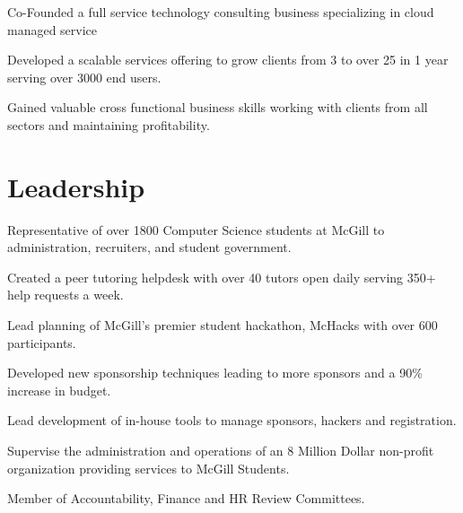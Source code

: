 \documentclass[]{deedy-resume-openfont}
\begin{document}
\begin{minipage}[t]{0.66\textwidth}
\begin{tightemize}
\item Co-Founded a full service technology consulting business specializing in cloud managed service
\item Developed a scalable services offering to grow clients from 3 to over 25 in 1 year serving over 3000 end users.
\item Gained valuable cross functional business skills working with clients from all sectors and maintaining profitability.
\end{tightemize}
\sectionsep


\section{Leadership}
\begin{tightemize}
\item Representative of over 1800 Computer Science students at McGill to administration, recruiters, and student government. 
\item Created a peer tutoring helpdesk with over 40 tutors open daily serving 350+ help requests a week.
\end{tightemize}
\sectionsep

\begin{tightemize}
\item Lead planning of McGill's premier student hackathon, McHacks with over 600 participants.
\item Developed new sponsorship techniques leading to more sponsors and a 90\% increase in budget.
\item Lead development of in-house tools to manage sponsors, hackers and registration.
\end{tightemize}
\sectionsep

\begin{tightemize}
\item Supervise the administration and operations of an 8 Million Dollar non-profit organization providing services to McGill Students. 
\item Member of Accountability, Finance and HR Review Committees. 
\end{tightemize}
\sectionsep


\end{minipage}
\end{document}
